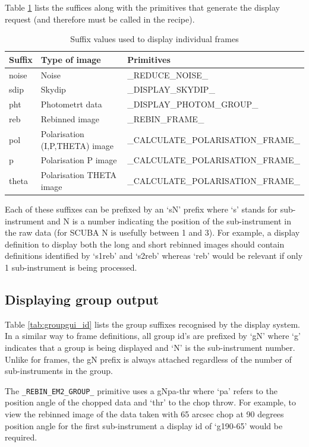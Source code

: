 \documentclass[twoside,11pt,nolof]{starlink}
\providecommand{\primitive}[1]{{\small\texttt{#1}}}
\begin{document}
Table \ref{tab:framegui_id} lists the suffices along with the primitives that
generate the display request (and therefore must be called in the recipe).

\begin{table}
\begin{center}
\begin{tabular}{lll}
Suffix & Type of image &Primitives \\ \hline
noise&Noise & \_REDUCE\_NOISE\_  \\
sdip &Skydip & \_DISPLAY\_SKYDIP\_ \\
pht  &Photometrt data & \_DISPLAY\_PHOTOM\_GROUP\_ \\
reb  &Rebinned image & \_REBIN\_FRAME\_ \\
pol  &Polarisation (I,P,THETA) image & \_CALCULATE\_POLARISATION\_FRAME\_ \\
p    &Polarisation P image & \_CALCULATE\_POLARISATION\_FRAME\_ \\
theta&Polarisation THETA image& \_CALCULATE\_POLARISATION\_FRAME\_ \\
\hline
\end{tabular}
\caption{Suffix values used to display individual frames}
\label{tab:framegui_id}
\end{center}
\end{table}

Each of these suffixes can be prefixed by an `sN' prefix where `s' stands for
sub-instrument and N is a number indicating the position of the sub-instrument
in the raw data (for SCUBA N is usefully between 1 and 3). For example,
a display definition to display both the long and short rebinned images
should contain definitions identified by `s1reb' and `s2reb' whereas
`reb' would be relevant if only 1 sub-instrument is being processed.

\subsection{Displaying group output}


Table \ref{tab:groupgui_id} lists the group suffixes recognised by the
display system.
In a similar way to frame definitions, all group id's are prefixed
by `gN' where `g' indicates that a group is being displayed
and `N' is the sub-instrument number. Unlike for frames, the
gN prefix is always attached regardless of the number of sub-instruments
in the group.

The \primitive{\_REBIN\_EM2\_GROUP\_} primitive uses a gNpa-thr where `pa' refers
to the position angle of the chopped data and `thr' to the chop throw.
For example, to view the rebinned image of the data taken with
65 arcsec chop at 90 degrees position angle for the first sub-instrument
a display id of `g190-65' would be required.
\end{document}
